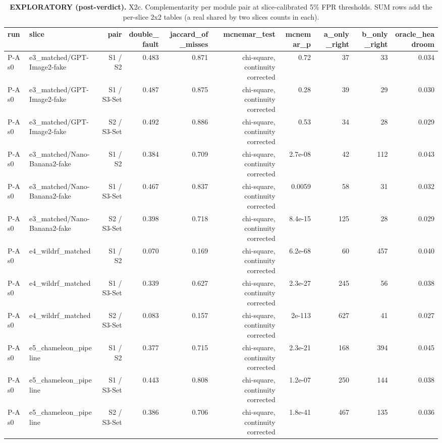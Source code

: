 \begin{table}[htbp]
\centering
\scriptsize
\caption{\textbf{EXPLORATORY (post-verdict).} X2c. Complementarity per module pair at slice-calibrated 5\% FPR thresholds. SUM rows add the per-slice 2x2 tables (a real shared by two slices counts in each).}
\label{tab:x2c-complementarity}
\begin{tabular}{llrrrrrrrr}
\toprule
run & slice & pair & double\_fault & jaccard\_of\_misses & mcnemar\_test & mcnemar\_p & a\_only\_right & b\_only\_right & oracle\_headroom \\
\midrule
P-A s0 & e3\_matched/GPT-Image2-fake & S1 / S2 & 0.483 & 0.871 & chi-square, continuity corrected & 0.72 & 37 & 33 & 0.034 \\
P-A s0 & e3\_matched/GPT-Image2-fake & S1 / S3-Set & 0.487 & 0.875 & chi-square, continuity corrected & 0.28 & 39 & 29 & 0.030 \\
P-A s0 & e3\_matched/GPT-Image2-fake & S2 / S3-Set & 0.492 & 0.886 & chi-square, continuity corrected & 0.53 & 34 & 28 & 0.029 \\
P-A s0 & e3\_matched/Nano-Banana2-fake & S1 / S2 & 0.384 & 0.709 & chi-square, continuity corrected & 2.7e-08 & 42 & 112 & 0.043 \\
P-A s0 & e3\_matched/Nano-Banana2-fake & S1 / S3-Set & 0.467 & 0.837 & chi-square, continuity corrected & 0.0059 & 58 & 31 & 0.032 \\
P-A s0 & e3\_matched/Nano-Banana2-fake & S2 / S3-Set & 0.398 & 0.718 & chi-square, continuity corrected & 8.4e-15 & 125 & 28 & 0.029 \\
P-A s0 & e4\_wildrf\_matched & S1 / S2 & 0.070 & 0.169 & chi-square, continuity corrected & 6.2e-68 & 60 & 457 & 0.040 \\
P-A s0 & e4\_wildrf\_matched & S1 / S3-Set & 0.339 & 0.627 & chi-square, continuity corrected & 2.3e-27 & 245 & 56 & 0.038 \\
P-A s0 & e4\_wildrf\_matched & S2 / S3-Set & 0.083 & 0.157 & chi-square, continuity corrected & 2e-113 & 627 & 41 & 0.027 \\
P-A s0 & e5\_chameleon\_pipeline & S1 / S2 & 0.377 & 0.715 & chi-square, continuity corrected & 2.3e-21 & 168 & 394 & 0.045 \\
P-A s0 & e5\_chameleon\_pipeline & S1 / S3-Set & 0.443 & 0.808 & chi-square, continuity corrected & 1.2e-07 & 250 & 144 & 0.038 \\
P-A s0 & e5\_chameleon\_pipeline & S2 / S3-Set & 0.386 & 0.706 & chi-square, continuity corrected & 1.8e-41 & 467 & 135 & 0.036 \\

\end{tabular}
\end{table}
